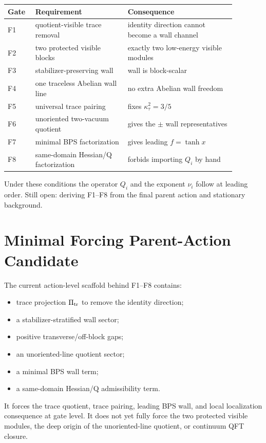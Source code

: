 \documentclass[11pt]{article}
\begin{document}
\begin{longtable}{p{0.10\linewidth}p{0.36\linewidth}p{0.42\linewidth}}
\toprule
\textbf{Gate} & \textbf{Requirement} & \textbf{Consequence}\\
\midrule
F1 & quotient-visible trace removal & identity direction cannot become a wall channel\\
F2 & two protected visible blocks & exactly two low-energy visible modules\\
F3 & stabilizer-preserving wall & wall is block-scalar\\
F4 & one traceless Abelian wall line & no extra Abelian wall freedom\\
F5 & universal trace pairing & fixes $\kappa_\tau^2=3/5$\\
F6 & unoriented two-vacuum quotient & gives the $\pm$ wall representatives\\
F7 & minimal BPS factorization & gives leading $f=\tanh x$\\
F8 & same-domain Hessian/Q factorization & forbids importing $Q_i$ by hand\\
\bottomrule
\end{longtable}

Under these conditions the operator $Q_i$ and the exponent $\nu_i$ follow at
leading order.  Still open: deriving F1--F8 from the final parent action and
stationary background.

\section{Minimal Forcing Parent-Action Candidate}
The current action-level scaffold behind F1--F8 contains:
\begin{itemize}
\item trace projection $\Pi_{\rm tr}$ to remove the identity direction;
\item a stabilizer-stratified wall sector;
\item positive transverse/off-block gaps;
\item an unoriented-line quotient sector;
\item a minimal BPS wall term;
\item a same-domain Hessian/Q admissibility term.
\end{itemize}
It forces the trace quotient, trace pairing, leading BPS wall, and local
localization consequence at gate level.  It does not yet fully force the two
protected visible modules, the deep origin of the unoriented-line quotient, or
continuum QFT closure.
\end{document}
